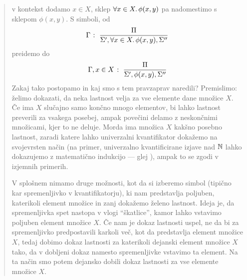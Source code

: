 \begin{itemize}
\begin{itemize}
                                        \begin{quote}
                                                v kontekst dodamo $x \in X$, sklep $\forall x \in X .\, \phi(x, y)$ pa nadomestimo s sklepom $\phi(x, y)$. S simboli, od
                                                \[{\Gamma} \;\colon\; \frac{\Pi}{\Sigma', \forall x \in X .\, \phi(x, y), \Sigma''}\]
                                                preidemo do
                                                \[{\Gamma, x \in X} \;\colon\; \frac{\Pi}{\Sigma', \phi(x, y), \Sigma''}\]
                                                Zakaj tako postopamo in kaj smo s tem pravzaprav naredili? Premislimo: želimo dokazati, da neka lastnost velja za vse elemente dane množice $X$. Če ima $X$ slučajno samo končno mnogo elementov, bi lahko lastnost preverili za vsakega posebej, ampak povečini delamo z neskončnimi množicami, kjer to ne deluje. Morda ima množica $X$ kakšno posebno lastnost, zaradi katere lahko univerzalni kvantifikator dokažemo na svojevrsten način (na primer, univerzalno kvantificirane izjave nad $\mathbb{N}$ lahko dokazujemo z matematično indukcijo --- glej ), ampak to se zgodi v izjemnih primerih.

                                                V splošnem nimamo druge možnosti, kot da si izberemo simbol (tipično kar spremenljivko v kvantifikatorju), ki nam predstavlja poljuben, katerikoli element množice in zanj dokažemo želeno lastnost. Ideja je, da spremenljivka spet nastopa v vlogi ``škatlice'', kamor lahko vstavimo poljuben element množice $X$. Če nam je dokaz lastnosti uspel, ne da bi za spremenljivko predpostavili karkoli več, kot da predstavlja element množice $X$, tedaj dobimo dokaz lastnosti za katerikoli dejanski element množice $X$ tako, da v dobljeni dokaz namesto spremenljivke vstavimo ta element. Na ta način smo potem dejansko dobili dokaz lastnosti za vse elemente množice $X$.


\end{quote}
\end{itemize}
\end{itemize}
